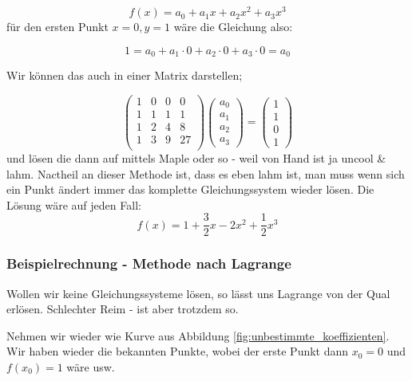 \begin{displaymath}
f(x) = a_0 + a_1x + a_2x^2 + a_3x^3
\end{displaymath}
für den ersten Punkt \(x = 0, y = 1\) wäre die Gleichung also:

\begin{displaymath}
1 = a_0 + a_1\cdot 0 + a_2\cdot 0 + a_3\cdot 0 = a_0
\end{displaymath}

Wir können das auch in einer Matrix darstellen;

\begin{displaymath}
\begin{pmatrix}
	1 & 0 & 0 & 0 \\
	1 & 1 & 1 & 1 \\
	1 & 2 & 4 & 8 \\
	1 & 3 & 9 & 27\\
\end{pmatrix}
\begin{pmatrix}
a_0 \\
a_1 \\
a_2 \\
a_3
\end{pmatrix}
= 
\begin{pmatrix}
1 \\
1 \\
0 \\
1
\end{pmatrix}
\end{displaymath}
und lösen die dann auf mittels Maple oder so - weil von Hand ist ja uncool \& lahm.
Nactheil an dieser Methode ist, dass es eben lahm ist, man muss wenn sich ein Punkt ändert immer das komplette Gleichungssystem wieder lösen. Die Lösung wäre auf jeden Fall:
\begin{displaymath}
f(x) = 1 + \frac{3}{2}x - 2x^2 + \frac{1}{2}x^3
\end{displaymath}
\subsubsection{Beispielrechnung - Methode nach Lagrange}
Wollen wir keine Gleichungssysteme lösen, so lässt uns Lagrange von der Qual erlösen. Schlechter Reim - ist aber trotzdem so.

Nehmen wir wieder wie Kurve aus Abbildung \ref{fig:unbestimmte_koeffizienten}. Wir haben wieder die bekannten Punkte, wobei der erste Punkt dann \(x_0 = 0\) und \(f(x_0) = 1\)  wäre usw.

